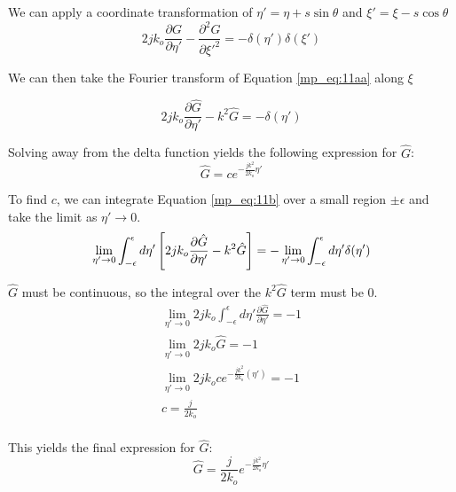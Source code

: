 We can apply a coordinate transformation of $\eta' = \eta + s\sin\theta$ and $\xi' = \xi - s\cos\theta$
\begin{equation}
2jk_o \frac{\partial G}{\partial \eta'} - \frac{\partial^2 G}{\partial \xi'^2} = -\delta(\eta')\delta(\xi')
\label{mp_eq:11aa}
\end{equation}

We can then take the Fourier transform of Equation \ref{mp_eq:11aa} along $\xi$

\begin{equation}
2jk_o\frac{\partial \hat{G}}{\partial \eta'} -k^2\hat{G} = -\delta(\eta')
\label{mp_eq:11b}
\end{equation}

Solving away from the delta function yields the following expression for $\hat{G}$:
\begin{equation}
\hat{G}= ce^{-\frac{jk^2}{2k_o}\eta'}
\label{mp_eq:11c}
\end{equation}

To find $c$, we can integrate Equation \ref{mp_eq:11b} over a small region $\pm\epsilon$ and take the limit as $\eta'\rightarrow 0$.
\begin{equation}
\lim_{\eta'\rightarrow 0}\int_{-\epsilon}^{\epsilon}d\eta'\left[2jk_o\frac{\partial\hat{G}}{\partial \eta'}- k^2\hat{G} \right] = -\lim_{\eta'\rightarrow 0}\int_{-\epsilon}^{\epsilon}d\eta'\delta(\eta')\\
\label{mp_eq:11ca}
\end{equation}

$\hat{G}$ must be continuous, so the integral over the $k^2\hat{G}$ term must be 0.
\begin{equation}
\begin{gathered}
\lim_{\eta'\rightarrow 0}2jk_o\int_{-\epsilon}^{\epsilon}d\eta'\frac{\partial\hat{G}}{\partial \eta'}= -1\\
\lim_{\eta'\rightarrow 0}2jk_o\hat{G} = -1 \\
\lim_{\eta'\rightarrow 0}2jk_oce^{-\frac{jk^2}{2k_o}(\eta')} = -1\\
c = \frac{j}{2k_o}\\
\end{gathered}
\label{mp_eq:11cb}
\end{equation}

This yields the final expression for $\hat{G}$:
\begin{equation}
\boxed{\hat{G}= \frac{j}{2k_o}e^{-\frac{jk^2}{2k_o}\eta'}}
\label{mp_eq:11cc}
\end{equation}

